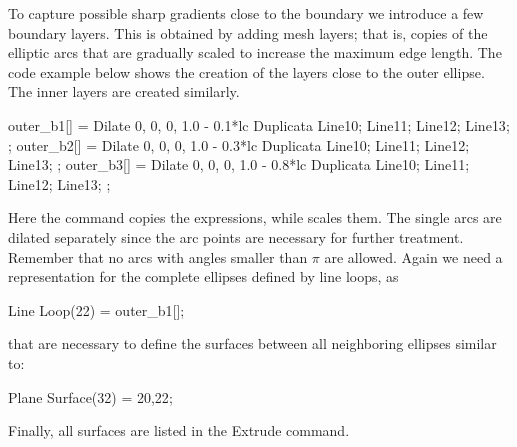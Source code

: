 %
%
%
To capture possible sharp gradients close to the boundary we introduce a few boundary layers. 
This is obtained by 
adding mesh layers; that is, copies of the elliptic arcs that are gradually
scaled to increase the maximum edge length. The code example below shows the creation of the layers close to the outer ellipse. The inner layers are created similarly.
\begin{gencode}
outer_b1[] = Dilate {{0, 0, 0}, 1.0 - 0.1*lc } {
Duplicata{  Line{10}; Line{11}; Line{12}; Line{13}; } };
outer_b2[] = Dilate {{0, 0, 0}, 1.0 - 0.3*lc } {
Duplicata{  Line{10}; Line{11}; Line{12}; Line{13}; } };
outer_b3[] = Dilate {{0, 0, 0}, 1.0 - 0.8*lc } {
Duplicata{  Line{10}; Line{11}; Line{12}; Line{13}; } };
\end{gencode}
Here the command  copies the expressions, while  scales them.    
The single arcs are dilated separately since the arc points are necessary for further treatment. Remember that no arcs with angles smaller than $\pi$ are allowed. Again we need a representation for the complete ellipses defined by line loops, as
\begin{gencode}
Line Loop(22) = {outer_b1[]};
\end{gencode}
that are necessary to define the surfaces between all neighboring ellipses similar to:
\begin{gencode}
Plane Surface(32) = {20,22};
\end{gencode}
Finally, all surfaces are listed in the Extrude command.


